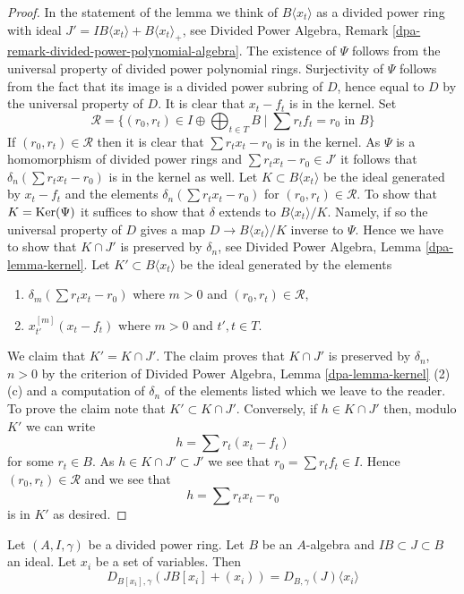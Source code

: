\begin{proof}
In the statement of the lemma we think of $B\langle x_t \rangle$
as a divided power ring with ideal
$J' = IB\langle x_t \rangle + B\langle x_t \rangle_{+}$, see
Divided Power Algebra, Remark \ref{dpa-remark-divided-power-polynomial-algebra}.
The existence of $\Psi$ follows from the universal property of
divided power polynomial rings. Surjectivity of $\Psi$ follows from
the fact that its image is a divided power subring of $D$, hence equal to $D$
by the universal property of $D$. It is clear that
$x_t - f_t$ is in the kernel. Set
$$
\mathcal{R} = \{(r_0, r_t) \in I \oplus \bigoplus\nolimits_{t \in T} B
\mid \sum r_t f_t = r_0 \text{ in }B\}
$$
If $(r_0, r_t) \in \mathcal{R}$ then it is clear that
$\sum r_t x_t - r_0$ is in the kernel.
As $\Psi$ is a homomorphism of divided power rings
and $\sum r_tx_t - r_0 \in J'$
it follows that $\delta_n(\sum r_t x_t - r_0)$ is in the kernel as well.
Let $K \subset B\langle x_t \rangle$ be the ideal generated by
$x_t - f_t$ and the elements $\delta_n(\sum r_t x_t - r_0)$ for
$(r_0, r_t) \in \mathcal{R}$.
To show that $K = \mathop{\mathrm{Ker}}(\Psi)$ it suffices to show that
$\delta$ extends to $B\langle x_t \rangle/K$. Namely, if so the universal
property of $D$ gives a map $D \to B\langle x_t \rangle/K$
inverse to $\Psi$. Hence we have to show that $K \cap J'$ is
preserved by $\delta_n$, see
Divided Power Algebra, Lemma \ref{dpa-lemma-kernel}.
Let $K' \subset B\langle x_t \rangle$ be the ideal
generated by the elements
\begin{enumerate}
\item $\delta_m(\sum r_t x_t - r_0)$ where $m > 0$ and
$(r_0, r_t) \in \mathcal{R}$,
\item $x_{t'}^{[m]}(x_t - f_t)$ where $m > 0$ and $t', t \in T$.
\end{enumerate}
We claim that $K' = K \cap J'$. The claim proves that $K \cap J'$
is preserved by $\delta_n$, $n > 0$ by the criterion of
Divided Power Algebra, Lemma \ref{dpa-lemma-kernel} (2)(c)
and a computation of $\delta_n$
of the elements listed which we leave to the reader.
To prove the claim note that $K' \subset K \cap J'$.
Conversely, if $h \in K \cap J'$ then, modulo $K'$ we can write
$$
h = \sum r_t (x_t - f_t)
$$
for some $r_t \in B$. As $h \in K \cap J' \subset J'$
we see that $r_0 = \sum r_t f_t \in I$. Hence $(r_0, r_t) \in \mathcal{R}$
and we see that
$$
h = \sum r_t x_t - r_0
$$
is in $K'$ as desired.
\end{proof}

\begin{lemma}
\label{lemma-divided-power-envelope-add-variables}
Let $(A, I, \gamma)$ be a divided power ring.
Let $B$ be an $A$-algebra and $IB \subset J \subset B$ an ideal.
Let $x_i$ be a set of variables. Then
$$
D_{B[x_i], \gamma}(JB[x_i] + (x_i)) = D_{B, \gamma}(J) \langle x_i \rangle
$$
\end{lemma}

